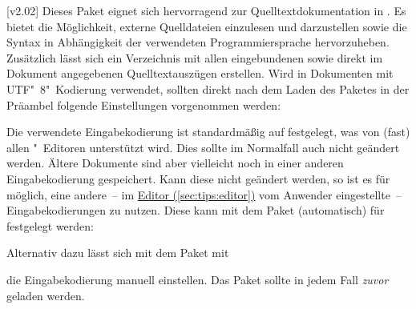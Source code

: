 \begin{DeclarePackages}
[v2.02]
  Dieses Paket eignet sich hervorragend zur Quelltextdokumentation in 
  . Es bietet die Möglichkeit, externe Quelldateien einzulesen 
  und darzustellen sowie die Syntax in Abhängigkeit der verwendeten 
  Programmiersprache hervorzuheben. Zusätzlich lässt sich ein Verzeichnis mit 
  allen eingebundenen sowie direkt im Dokument angegebenen Quelltextauszügen 
  erstellen. Wird  in Dokumenten mit UTF"~8"~Kodierung 
  verwendet, sollten direkt nach dem Laden des Paketes in der Präambel folgende 
  Einstellungen vorgenommen werden:
\begin{quoting}[rightmargin=0pt]
\begin{Code}
\end{Code}
\end{quoting}
  Die verwendete Eingabekodierung ist standardmäßig auf 
  festgelegt, was von (fast) allen "~Editoren unterstützt wird. 
  Dies sollte im Normalfall auch nicht geändert werden. Ältere Dokumente sind 
  aber vielleicht noch in einer anderen Eingabekodierung gespeichert. Kann 
  diese nicht geändert werden, so ist es für  möglich, eine 
  andere~-- im \hyperref[sec:tips:editor]{Editor (\autoref*{sec:tips:editor})} 
  vom Anwender eingestellte~-- Eingabekodierungen zu nutzen. Diese kann mit dem 
  Paket  (automatisch) für  festgelegt werden:
\begin{quoting}[rightmargin=0pt]
\begin{Code}
\usepackage{selinput}
\end{Code}
\end{quoting}
  Alternativ dazu lässt sich mit dem Paket  mit
\begin{quoting}[rightmargin=0pt]
\end{quoting}
  die Eingabekodierung manuell einstellen. Das Paket  sollte 
  in jedem Fall \emph{zuvor} geladen werden.
\end{DeclarePackages}



